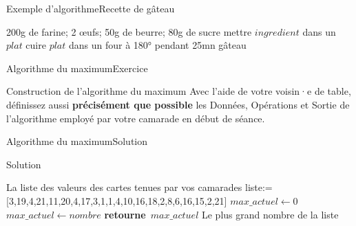 \documentclass{beamer}
\newcommand{\algorithmicreturn}{\textbf{retourne}}
\newcommand{\RETURN}{\STATE \algorithmicreturn \ }
\begin{document}
\begin{frame}{Exemple d'algorithme}{Recette de gâteau}
	\begin{algorithmic}[1]
		\REQUIRE 200g de farine; 2 œufs; 50g de beurre; 80g de sucre
		\pause
		\pause
		\STATE mettre $ingredient$ dans un $plat$
		\pause
		\ENDFOR
		\State cuire $plat$ dans un four à 180° pendant 25mn
		\pause
		 gâteau
	\end{algorithmic}

\end{frame}

\begin{frame}{Algorithme du maximum}{Exercice}
	\begin{alertblock}{Construction de l'algorithme du maximum}
		Avec l'aide de votre voisin·e de table, définissez aussi \textbf{précisément que possible} les Données, Opérations et Sortie de l'algorithme employé par votre camarade en début de séance.
	\end{alertblock}
\end{frame}

\begin{frame}{Algorithme du maximum}{Solution}
	\begin{exampleblock}{Solution}
		\begin{algorithmic}[1]
			\REQUIRE
			La liste des valeurs des cartes tenues par vos camarades
			liste:=[3,19,4,21,11,20,4,17,3,1,1,4,10,16,18,2,8,6,16,15,2,21]
			\STATE $max\_actuel \gets 0$
			\STATE $max\_actuel \gets nombre$
			\ENDIF
			\ENDFOR
			\RETURN $max\_actuel$
			\ENSURE Le plus grand nombre de la liste
		\end{algorithmic}
	\end{exampleblock}

\end{frame}
\end{document}
